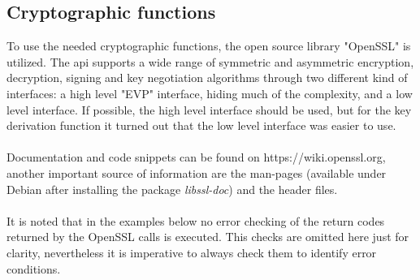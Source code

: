 \subsection{Cryptographic functions}
To use the needed cryptographic functions, the open source library "OpenSSL" is utilized. The \gls{api} supports a wide range of symmetric and asymmetric encryption, 
decryption, signing and key negotiation algorithms through two different kind of interfaces: a high level "EVP" interface, hiding much of the complexity, and 
a low level interface. If possible, the high level interface should be used, but for the key derivation function it turned out that the low level interface was easier to use.
\\
\\
Documentation and code snippets can be found on https://wiki.openssl.org, another important source of information are the man-pages (available under Debian after installing the
package \textit{libssl-doc}) and the header files.
\\
\\
It is noted that in the examples below no error checking of the return codes returned by the OpenSSL calls is executed. This checks are omitted here just for clarity, nevertheless it is
imperative to always check them to identify error conditions.


